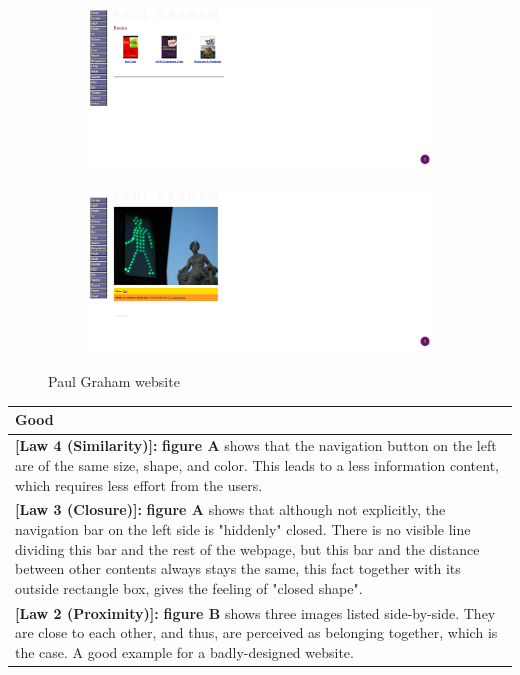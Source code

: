 \documentclass[a4paper,12pt,oneside]{scrreprt}
\begin{document}
\begin{figure}[H]
	\centering
	\begin{subfigure}{.5\textwidth}
		\centering
		\includegraphics[clip, trim=0cm 7cm 25cm 0cm, scale=0.5]{./images/bad3.png}
		\label{fig:sub1}
	\end{subfigure}%
	\begin{subfigure}{.5\textwidth}
		\centering
		\includegraphics[clip, trim=-2cm 7cm 25cm 0cm, scale=0.50]{./images/bad1.png}
		\label{fig:sub2}
	\end{subfigure}
	\caption{Paul Graham website}
	\label{fig:test}
\end{figure}


\begin{tabularx}{\textwidth}{|X|}
	\hline
	\textbf{Good}\\
	\hline
	\textbf{{[Law 4 (Similarity)]:}} \textbf{figure A} shows that the navigation button on the left are of the same size, shape, and color. This leads to a less information content, which requires less effort from the users.\\
	\hline
	\textbf{{[Law 3 (Closure)]:}} \textbf{figure A} shows that although not explicitly, the navigation bar on the left side is "hiddenly" closed. There is no visible line dividing this bar and the rest of the webpage, but this bar and the distance between other contents always stays the same, this fact together with its outside rectangle box, gives the feeling of "closed shape".\\
	\hline
	\textbf{{[Law 2 (Proximity)]:}} \textbf{figure B} shows three images listed side-by-side. They are close to each other, and thus, are perceived as belonging together, which is the case. A good example for a badly-designed website.\\
	\hline
\end{tabularx}
\end{document}
